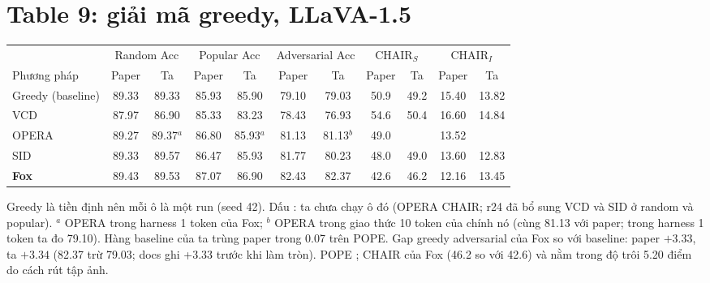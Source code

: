 \section{Table 9: giải mã greedy, LLaVA-1.5}
\begin{center}\small
\setlength{\tabcolsep}{3.5pt}
\begin{tabular}{@{}l *{5}{cc}@{}}
\toprule
& \multicolumn{2}{c}{Random Acc} & \multicolumn{2}{c}{Popular Acc} & \multicolumn{2}{c}{Adversarial Acc} & \multicolumn{2}{c}{CHAIR$_S$} & \multicolumn{2}{c}{CHAIR$_I$} \\
\cmidrule(lr){2-3}\cmidrule(lr){4-5}\cmidrule(lr){6-7}\cmidrule(lr){8-9}\cmidrule(lr){10-11}
Phương pháp & Paper & Ta & Paper & Ta & Paper & Ta & Paper & Ta & Paper & Ta \\
\midrule
Greedy (baseline) & 89.33 & 89.33 & 85.93 & 85.90 & 79.10 & 79.03 & 50.9 & 49.2 & 15.40 & 13.82 \\
VCD & 87.97 & 86.90 & 85.33 & 83.23 & 78.43 & 76.93 & 54.6 & 50.4 & 16.60 & 14.84 \\
OPERA & 89.27 & 89.37$^{a}$ & 86.80 & 85.93$^{a}$ & 81.13 & 81.13$^{b}$ & 49.0 & \mute{---} & 13.52 & \mute{---} \\
SID & 89.33 & 89.57 & 86.47 & 85.93 & 81.77 & 80.23 & 48.0 & 49.0 & 13.60 & 12.83 \\
\textbf{Fox} & 89.43 & 89.53 & 87.07 & 86.90 & 82.43 & 82.37 & 42.6 & 46.2 & 12.16 & 13.45 \\
\bottomrule
\end{tabular}
\end{center}
\noindent\small Greedy là tiền định nên mỗi ô là một run (seed 42). Dấu \mute{---}: ta chưa chạy ô đó (OPERA CHAIR; r24 đã bổ sung VCD và SID ở random và popular). $^{a}$ OPERA trong harness 1 token của Fox; $^{b}$ OPERA trong giao thức 10 token của chính nó (cùng 81.13 với paper; trong harness 1 token ta đo 79.10). Hàng baseline của ta trùng paper trong 0.07 trên POPE. Gap greedy adversarial của Fox so với baseline: paper $+3.33$, ta $+3.34$ (82.37 trừ 79.03; docs ghi +3.33 trước khi làm tròn). POPE ; CHAIR của Fox  (46.2 so với 42.6) và nằm trong độ trôi 5.20 điểm do cách rút tập ảnh.

